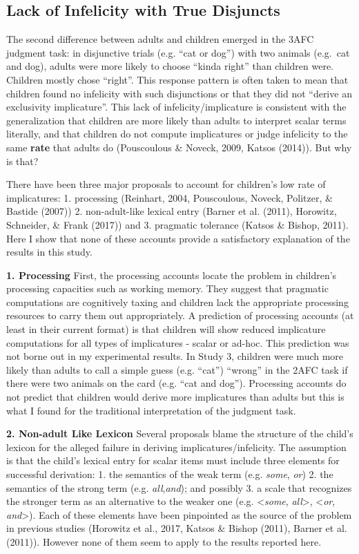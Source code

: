 \documentclass[oneside]{report}
\theoremstyle{definition}
\theoremstyle{definition}
\theoremstyle{definition}
\theoremstyle{remark}
\begin{document}
\subsection{Lack of Infelicity with True
Disjuncts}\label{lack-of-infelicity-with-true-disjuncts}

The second difference between adults and children emerged in the 3AFC
judgment task: in disjunctive trials (e.g. ``cat or dog'') with two
animals (e.g.~cat and dog), adults were more likely to choose ``kinda
right'' than children were. Children mostly chose ``right''. This
response pattern is often taken to mean that children found no
infelicity with such disjunctions or that they did not ``derive an
exclusivity implicature''. This lack of infelicity/implicature is
consistent with the generalization that children are more likely than
adults to interpret scalar terms literally, and that children do not
compute implicatures or judge infelicity to the same \textbf{rate} that
adults do (Pouscoulous \& Noveck, 2009, Katsos (2014)). But why is that?

There have been three major proposals to account for children's low rate
of implicatures: 1. processing (Reinhart, 2004, Pouscoulous, Noveck,
Politzer, \& Bastide (2007)) 2. non-adult-like lexical entry (Barner et
al. (2011), Horowitz, Schneider, \& Frank (2017)) and 3. pragmatic
tolerance (Katsos \& Bishop, 2011). Here I show that none of these
accounts provide a satisfactory explanation of the results in this
study.

\textbf{1. Processing} First, the processing accounts locate the problem
in children's processing capacities such as working memory. They suggest
that pragmatic computations are cognitively taxing and children lack the
appropriate processing resources to carry them out appropriately. A
prediction of processing accounts (at least in their current format) is
that children will show reduced implicature computations for all types
of implicatures - scalar or ad-hoc. This prediction was not borne out in
my experimental results. In Study 3, children were much more likely than
adults to call a simple guess (e.g. ``cat'') ``wrong'' in the 2AFC task
if there were two animals on the card (e.g. ``cat and dog''). Processing
accounts do not predict that children would derive more implicatures
than adults but this is what I found for the traditional interpretation
of the judgment task.

\textbf{2. Non-adult Like Lexicon} Several proposals blame the structure
of the child's lexicon for the alleged failure in deriving
implicatures/infelicity. The assumption is that the child's lexical
entry for scalar items must include three elements for successful
derivation: 1. the semantics of the weak term (e.g. \emph{some},
\emph{or}) 2. the semantics of the strong term (e.g.
\emph{all},\emph{and}); and possibly 3. a scale that recognizes the
stronger term as an alternative to the weaker one (e.g.
\textless{}\emph{some}, \emph{all}\textgreater{}, \textless{}\emph{or},
\emph{and}\textgreater{}). Each of these elements have been pinpointed
as the source of the problem in previous studies (Horowitz et al., 2017,
Katsos \& Bishop (2011), Barner et al. (2011)). However none of them
seem to apply to the results reported here.
\end{document}

